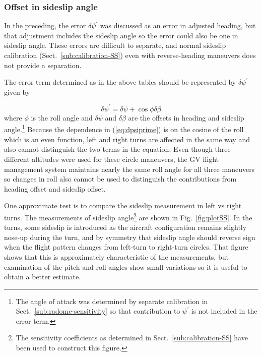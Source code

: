 \documentclass[12pt,twoside,english]{article}\usepackage[]{graphicx}\usepackage[]{color}
\begin{document}
{{\subsubsection{Offset in sideslip angle\label{sub:Offset-in-Sideslip}}

In the preceding, the error $\delta\psi^{\prime}$ was discussed as an error in adjusted heading, but that adjustment includes the sideslip angle so the error could also be one in sideslip angle. These errors are difficult to separate, and normal sideslip calibration (Sect.~\ref{sub:calibration-SS}) even with reverse-heading maneuvers does not provide a separation. 

The error term determined as in the above tables should be represented by $\delta\psi^{\prime}$ given by 

\begin{equation}
\delta\psi^{\prime}=\delta\psi+\cos\phi\delta\beta\label{eq:dpsiprime} 
\end{equation}
where $\phi$ is the roll angle and $\delta\psi$ and $\delta\beta$ are the offsets in heading and sideslip angle.\footnote{The angle of attack was determined by separate calibration in Sect.~\ref{sub:radome-sensitivity} so that contribution to $\psi^{\prime}$ is not included in the error term.} Because the dependence in (\ref{eq:dpsiprime}) is on the cosine of the roll which is an even function, left and right turns are affected in the same way and also cannot distinguish the two terms in the equation. Even though three different altitudes were used for these circle maneuvers, the GV flight management system maintains nearly the same roll angle for all three maneuvers so changes in roll also cannot be used to distinguish the contributions from heading offset and sideslip offset. 

One approximate test is to compare the sideslip measurement in left vs right turns. The measurements of sideslip angle\footnote{The sensitivity coefficients as determined in Sect.~\ref{sub:calibration-SS} have been used to construct this figure.} are shown in Fig.~\ref{fig:plotSS}. In the turns, some sideslip is introduced as the aircraft configuration remains slightly nose-up during the turn, and by symmetry that sideslip angle should reverse sign when the flight pattern changes from left-turn to right-turn circles. That figure shows that this is approximately characteristic of the measurements, but examination of the pitch and roll angles show small variations so it is useful to obtain a better estimate.


}}
\end{document}

